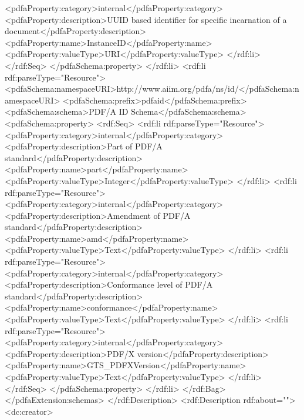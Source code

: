 {                    <pdfaProperty:category>internal</pdfaProperty:category>
                    <pdfaProperty:description>UUID based identifier for specific incarnation of a document</pdfaProperty:description>
                    <pdfaProperty:name>InstanceID</pdfaProperty:name>
                    <pdfaProperty:valueType>URI</pdfaProperty:valueType>
                  </rdf:li>
                </rdf:Seq>
              </pdfaSchema:property>
            </rdf:li>
            <rdf:li rdf:parseType="Resource">
              <pdfaSchema:namespaceURI>http://www.aiim.org/pdfa/ns/id/</pdfaSchema:namespaceURI>
              <pdfaSchema:prefix>pdfaid</pdfaSchema:prefix>
              <pdfaSchema:schema>PDF/A ID Schema</pdfaSchema:schema>
              <pdfaSchema:property>
                <rdf:Seq>
                  <rdf:li rdf:parseType="Resource">
                    <pdfaProperty:category>internal</pdfaProperty:category>
                    <pdfaProperty:description>Part of PDF/A standard</pdfaProperty:description>
                    <pdfaProperty:name>part</pdfaProperty:name>
                    <pdfaProperty:valueType>Integer</pdfaProperty:valueType>
                  </rdf:li>
                  <rdf:li rdf:parseType="Resource">
                    <pdfaProperty:category>internal</pdfaProperty:category>
                    <pdfaProperty:description>Amendment of PDF/A standard</pdfaProperty:description>
                    <pdfaProperty:name>amd</pdfaProperty:name>
                    <pdfaProperty:valueType>Text</pdfaProperty:valueType>
                  </rdf:li>
                  <rdf:li rdf:parseType="Resource">
                    <pdfaProperty:category>internal</pdfaProperty:category>
                    <pdfaProperty:description>Conformance level of PDF/A standard</pdfaProperty:description>
                    <pdfaProperty:name>conformance</pdfaProperty:name>
                    <pdfaProperty:valueType>Text</pdfaProperty:valueType>
                  </rdf:li>
                  <rdf:li rdf:parseType="Resource">
                    <pdfaProperty:category>internal</pdfaProperty:category>
                    <pdfaProperty:description>PDF/X version</pdfaProperty:description>
                    <pdfaProperty:name>GTS_PDFXVersion</pdfaProperty:name>
                    <pdfaProperty:valueType>Text</pdfaProperty:valueType>
                  </rdf:li>
                </rdf:Seq>
              </pdfaSchema:property>
            </rdf:li>
          </rdf:Bag>
        </pdfaExtension:schemas>
      </rdf:Description>
      <rdf:Description rdf:about="">
        <dc:creator>
}
